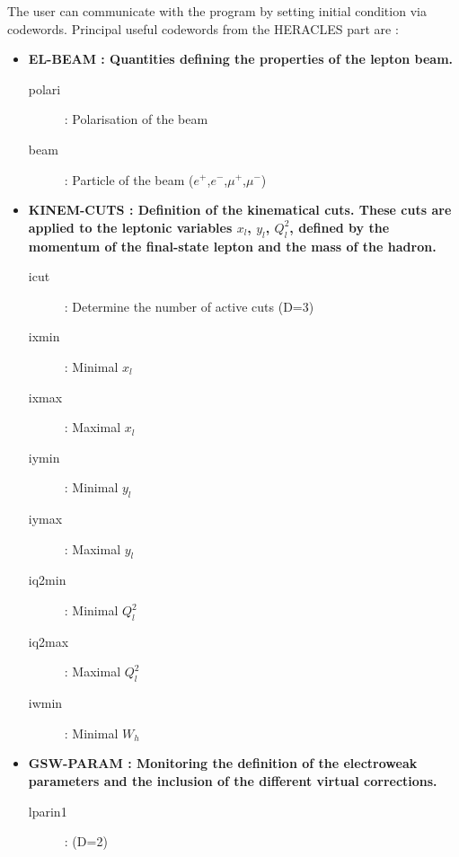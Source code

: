 \documentclass[letterpaper,12pt]{article}
\begin{document}
The user can communicate with the program by setting initial condition via codewords.
Principal useful codewords from the HERACLES part are :
\begin{itemize}
\item \textbf{EL-BEAM : Quantities defining the properties of the lepton beam.}
\begin{description}
\item[polari] : Polarisation of the beam
\item[beam] : Particle of the beam ($e^+$,$e^-$,$\mu^+$,$\mu^-$)
\end{description}
\item \textbf{KINEM-CUTS : Definition of the kinematical cuts. These cuts are applied to the
leptonic variables $x_l$, $y_l$, $Q^2_l$, defined by the momentum of the final-state
lepton and the mass of the hadron.}
\begin{description}
\item[icut] : Determine the number of active cuts (D=3)
\item[ixmin] : Minimal $x_l$
\item[ixmax] : Maximal $x_l$
\item[iymin] : Minimal $y_l$
\item[iymax] : Maximal $y_l$
\item[iq2min] : Minimal $Q^2_l$
\item[iq2max] : Maximal $Q^2_l$
\item[iwmin] : Minimal $W_h$
\end{description}
\item \textbf{GSW-PARAM : Monitoring the definition of the electroweak parameters and the
inclusion of the different virtual corrections.}
\begin{description}
\item[lparin1] : (D=2)

\end{description}
\end{itemize}
\end{document}
